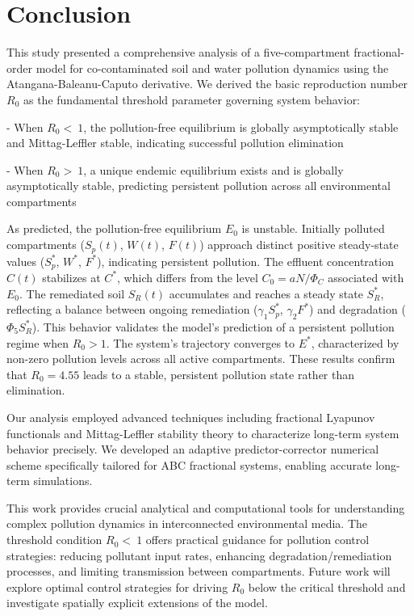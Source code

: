 \documentclass[10pt]{NSP1}
\begin{document}
\section{Conclusion}

This study presented a comprehensive analysis of a five-compartment fractional-order model for co-contaminated soil and water pollution dynamics using the Atangana-Baleanu-Caputo derivative. We derived the basic reproduction number \(R_{0}\) as the fundamental threshold parameter governing system behavior:

- When \(R_{0} < \ 1\), the pollution-free equilibrium is globally asymptotically stable and Mittag-Leffler stable, indicating successful pollution elimination

- When \(R_{0} > \ 1\), a unique endemic equilibrium exists and is globally asymptotically stable, predicting persistent pollution across all environmental compartments

As predicted, the pollution-free equilibrium \(E_{0}\) is unstable. Initially polluted compartments (\(S_{p}(t)\), \(W(t)\), \(F(t)\)) approach distinct positive steady-state values (\(S_{p}^{*}\), \(W^{*}\), \(F^{*}\)), indicating persistent pollution. The effluent concentration \(C(t)\) stabilizes at \(C^{*}\), which differs from the level \(C_{0} = aN/\Phi_{C}\) associated with \(E_{0}\). The remediated soil \(S_{R}(t)\) accumulates and reaches a steady state \(S_{R}^{*}\), reflecting a balance between ongoing remediation (\(\gamma_{1}S_{p}^{*}\), \(\gamma_{2}F^{*}\)) and degradation (\(\Phi_{5}S_{R}^{*}\)). This behavior validates the model's prediction of a persistent pollution regime when \(R_{0} > 1\). The system's trajectory converges to \(E^{*}\), characterized by non-zero pollution levels across all active compartments. These results confirm that \(R_{0} = 4.55\) leads to a stable, persistent pollution state rather than elimination.

Our analysis employed advanced techniques including fractional Lyapunov functionals and Mittag-Leffler stability theory to characterize long-term system behavior precisely. We developed an adaptive predictor-corrector numerical scheme specifically tailored for ABC fractional systems, enabling accurate long-term simulations.

This work provides crucial analytical and computational tools for understanding complex pollution dynamics in interconnected environmental media. The threshold condition \(R_{0} < \ 1\) offers practical guidance for pollution control strategies: reducing pollutant input rates, enhancing degradation/remediation processes, and limiting transmission between compartments. Future work will explore optimal control strategies for driving \(R_{0}\) below the critical threshold and investigate spatially explicit extensions of the model.
\end{document}
